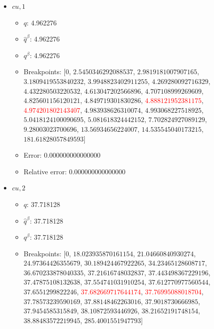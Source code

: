 \documentclass{article}%
\begin{document}
\begin{itemize}
\begin{itemize}
		\item $q^\beta$: 141.797836%
		\item Breakpoints: $[$$0$, $9.898970403313276$, $28.333333333333332$, $42.69900440382105$, $48.67452649027746$, $79.83702775273511$, $87.16107999267206$, $118.88765652962957$, $128.52021081477858$, $131.69760457629607$, $132.12228195956155$, $135.81963163113545$, $137.02923097052596$, $139.47623233772285$, $140.31685261310218$, \textcolor{red}{$140.7008934199032$}, \textcolor{red}{$142.4338700260237$}, $144.67005099128556$, $144.70843093515643$, $147.07009017600456$, $147.48374761404892$, $149.84689443310864$, $720.0$$]$%
		\item Error: 0.000000000000000%
		\item Relative error: 0.000000000000000%
	\end{itemize}%
	\item $\textit{cu},1$%
	\begin{itemize}%
		\item $q$: 4.962276%
		\item $\hat{q}^\beta$: 4.962276%
		\item $q^\beta$: 4.962276%
		\item Breakpoints: $[$$0$, $2.5450346292088537$, $2.9819181007907165$, $3.1809419553840232$, $3.9948823402911255$, $4.269280092716329$, $4.432280503220532$, $4.613047202566896$, $4.707108999269609$, $4.825601156120121$, $4.849719301830286$, \textcolor{red}{$4.888121952381175$}, \textcolor{red}{$4.974201802143407$}, $4.983938626310074$, $4.993068227518925$, $5.0418124100090695$, $5.081618324442152$, $7.702824927089129$, $9.28003023700696$, $13.56934656224007$, $14.535545040173215$, $181.61828057849593$$]$%
		\item Error: 0.000000000000000%
		\item Relative error: 0.000000000000000%
	\end{itemize}%
	\item $\textit{cu},2$%
	\begin{itemize}%
		\item $q$: 37.718128%
		\item $\hat{q}^\beta$: 37.718128%
		\item $q^\beta$: 37.718128%
		\item Breakpoints: $[$$0$, $18.023935870161154$, $21.04660840930274$, $24.97364426355679$, $30.189424467922265$, $34.23465128608717$, $36.670233878040335$, $37.21616748032837$, $37.443498367229196$, $37.47875108132638$, $37.554741031910254$, $37.612770977560544$, $37.6551299822246$, \textcolor{red}{$37.682669717644174$}, \textcolor{red}{$37.76995088018704$}, $37.78573239590169$, $37.88148462263016$, $37.9018730666985$, $37.9454585315849$, $38.10872593446926$, $38.21652191748154$, $38.88483572219945$, $285.4001551947793$$]$%

\end{itemize}
\end{itemize}
\end{document}
